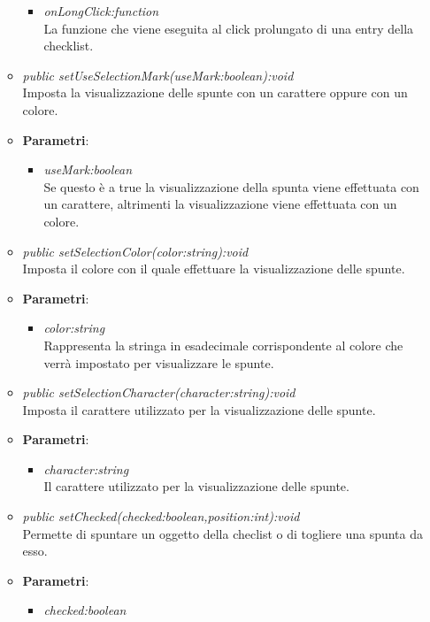 \begin{itemize}
\begin{itemize}
{\begin{itemize}
		La funzione che viene eseguita al click normale di una entry della checklist.
		\item \textit{onLongClick:function}\\
		La funzione che viene eseguita al click prolungato di una entry della checklist.
		\end{itemize}}
\item \textit{public setUseSelectionMark(useMark:boolean):void}\\
	Imposta la visualizzazione delle spunte con un carattere oppure con un colore.
		\item{\textbf{Parametri}: \begin{itemize}
		\item \textit{useMark:boolean}\\
		Se questo è a true la visualizzazione della spunta viene effettuata con un carattere, altrimenti la visualizzazione viene effettuata con un colore.
		\end{itemize}} 
	\item \textit{public setSelectionColor(color:string):void}\\
	Imposta il colore con il quale effettuare la visualizzazione delle spunte.
		\item{\textbf{Parametri}: \begin{itemize}
		\item \textit{color:string}\\
		Rappresenta la stringa in esadecimale corrispondente al colore che verrà impostato per visualizzare le spunte.
		\end{itemize}} 
	\item \textit{public setSelectionCharacter(character:string):void}\\
	Imposta il carattere utilizzato per la visualizzazione delle spunte.
		\item{\textbf{Parametri}: \begin{itemize}
		\item \textit{character:string}\\
		Il carattere utilizzato per la visualizzazione delle spunte.
		\end{itemize}}  
	\item \textit{public setChecked(checked:boolean,position:int):void}\\
	Permette di spuntare un oggetto della checlist o di togliere una spunta da esso.
		\item{\textbf{Parametri}: \begin{itemize}
		\item \textit{checked:boolean}\\

\end{itemize}}
\end{itemize}
\end{itemize}
